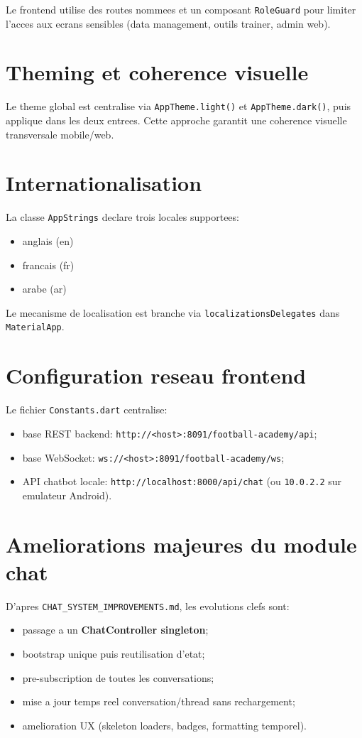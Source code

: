 Le frontend utilise des routes nommees et un composant \texttt{RoleGuard} pour limiter l'acces aux ecrans sensibles (data management, outils trainer, admin web).

\section{Theming et coherence visuelle}

Le theme global est centralise via \texttt{AppTheme.light()} et \texttt{AppTheme.dark()}, puis applique dans les deux entrees. Cette approche garantit une coherence visuelle transversale mobile/web.

\section{Internationalisation}

La classe \texttt{AppStrings} declare trois locales supportees:
\begin{itemize}[leftmargin=*]
  \item anglais (en)
  \item francais (fr)
  \item arabe (ar)
\end{itemize}

Le mecanisme de localisation est branche via \texttt{localizationsDelegates} dans \texttt{MaterialApp}.

\section{Configuration reseau frontend}

Le fichier \texttt{Constants.dart} centralise:
\begin{itemize}[leftmargin=*]
  \item base REST backend: \texttt{http://<host>:8091/football-academy/api};
  \item base WebSocket: \texttt{ws://<host>:8091/football-academy/ws};
  \item API chatbot locale: \texttt{http://localhost:8000/api/chat} (ou \texttt{10.0.2.2} sur emulateur Android).
\end{itemize}

\section{Ameliorations majeures du module chat}

D'apres \texttt{CHAT\_SYSTEM\_IMPROVEMENTS.md}, les evolutions clefs sont:
\begin{itemize}[leftmargin=*]
  \item passage a un \textbf{ChatController singleton};
  \item bootstrap unique puis reutilisation d'etat;
  \item pre-subscription de toutes les conversations;
  \item mise a jour temps reel conversation/thread sans rechargement;
  \item amelioration UX (skeleton loaders, badges, formatting temporel).
\end{itemize}

